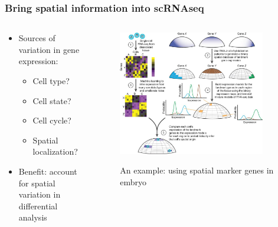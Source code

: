 \documentclass{beamer}
\begin{document}
  \begin{frame}
  \frametitle{Bring spatial information into scRNAseq}
  \begin{columns}
  \begin{column}{0.5\textwidth}
    \begin{itemize}
      \item Sources of variation in gene expression:
      \begin{itemize}
        \item Cell type?
        \item Cell state?
        \item Cell cycle?
        \item Spatial localization?
      \end{itemize}
      \item Benefit: account for spatial variation in differential analysis
    \end{itemize}
  \end{column}
  \begin{column}{0.5\textwidth}  %
    \begin{figure}
      \centering
      \includegraphics[width=0.9\textwidth]{seurat}
      \caption{An example: using spatial marker genes in embryo} \cite{Satija2015}
    \end{figure}
  \end{column}
  \end{columns}
  \end{frame}
\end{document}
